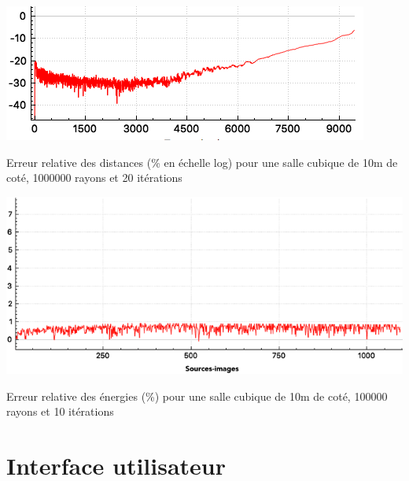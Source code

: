 \begin{figureth}
	\begin{subfigureth}{0.8\textwidth}
		\includegraphics[width=\linewidth]{images/test3}
		\caption{Erreur relative des distances (\% en échelle log) pour une salle cubique de 10m de coté, 1000000 rayons et 20 itérations}
		\label{test3}
	\end{subfigureth}
	\begin{subfigureth}{0.8\textwidth}
		\includegraphics[width=\linewidth]{images/test3bis}
		\caption{Erreur relative des énergies (\%) pour une salle cubique de 10m de coté, 100000 rayons et 10 itérations}
		\label{test3bis}
	\end{subfigureth}
\end{figureth}
		
		

\section{Interface utilisateur} \label{sect_add-on}

